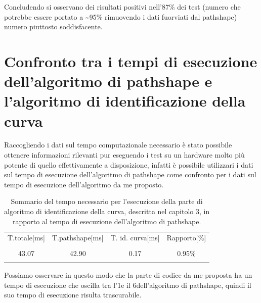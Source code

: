     Concludendo si osservano dei risultati positivi nell'87\% dei test (numero che potrebbe essere portato a \textasciitilde 95\% rimuovendo i dati fuorviati dal pathshape) numero piuttosto soddisfacente.

\section{Confronto tra i tempi di esecuzione dell'algoritmo di pathshape e l'algoritmo di identificazione della curva}

    Raccogliendo i dati sul tempo computazionale necessario è stato possibile ottenere informazioni rilevanti pur eseguendo i test su un hardware molto più potente di quello effettivamente a disposizione, infatti è possibile utilizzari i dati sul tempo di esecuzione dell'algoritmo di pathshape come confronto per i dati sul tempo di esecuzione dell'algoritmo da me proposto.


        \begin{table}[ht]
            \centering
            \begin{tabular}{cccc}
                T.totale[ms] & T.pathshape[ms] & T. id. curva[ms] & Rapporto[\%]\\
                \\
                43.07 & 42.90 & 0.17 & 0.95\% \\
                \\
            \end{tabular}
            \caption{Sommario del tempo necessario per l'esecuzione della parte di algoritmo di identificazione della curva, descritta nel capitolo 3, in rapporto al tempo di esecuzione dell'algoritmo di pathshape.}
        \end{table}

        Possiamo osservare in questo modo che la parte di codice da me proposta ha un tempo di esecuzione che oscilla tra l'1\textperthousand e il 6\textperthousand dell'algoritmo di pathshape, quindi il suo tempo di esecuzione risulta trascurabile.

